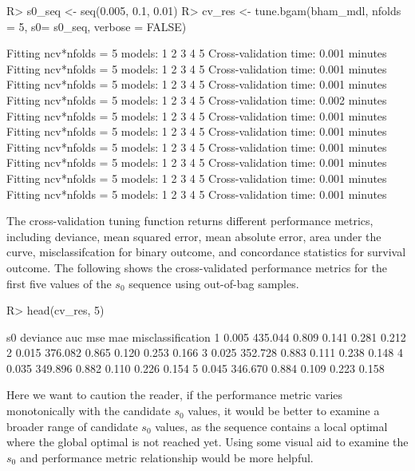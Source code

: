 \documentclass[
]{jss}
\begin{document}
\begin{CodeChunk}
\begin{CodeInput}
R> s0_seq <- seq(0.005, 0.1, 0.01)
R> cv_res <- tune.bgam(bham_mdl, nfolds = 5, s0= s0_seq, verbose = FALSE)
\end{CodeInput}
\begin{CodeOutput}
Fitting ncv*nfolds = 5 models: 
1 2 3 4 5 
 Cross-validation time: 0.001 minutes 
Fitting ncv*nfolds = 5 models: 
1 2 3 4 5 
 Cross-validation time: 0.001 minutes 
Fitting ncv*nfolds = 5 models: 
1 2 3 4 5 
 Cross-validation time: 0.001 minutes 
Fitting ncv*nfolds = 5 models: 
1 2 3 4 5 
 Cross-validation time: 0.002 minutes 
Fitting ncv*nfolds = 5 models: 
1 2 3 4 5 
 Cross-validation time: 0.001 minutes 
Fitting ncv*nfolds = 5 models: 
1 2 3 4 5 
 Cross-validation time: 0.001 minutes 
Fitting ncv*nfolds = 5 models: 
1 2 3 4 5 
 Cross-validation time: 0.001 minutes 
Fitting ncv*nfolds = 5 models: 
1 2 3 4 5 
 Cross-validation time: 0.001 minutes 
Fitting ncv*nfolds = 5 models: 
1 2 3 4 5 
 Cross-validation time: 0.001 minutes 
Fitting ncv*nfolds = 5 models: 
1 2 3 4 5 
 Cross-validation time: 0.001 minutes 
\end{CodeOutput}
\end{CodeChunk}

The cross-validation tuning function returns different performance
metrics, including deviance, mean squared error, mean absolute error,
area under the curve, misclassifcation for binary outcome, and
concordance statistics for survival outcome. The following shows the
cross-validated performance metrics for the first five values of the
\(s_0\) sequence using out-of-bag samples.

\begin{CodeChunk}
\begin{CodeInput}
R> head(cv_res, 5)
\end{CodeInput}
\begin{CodeOutput}
     s0 deviance   auc   mse   mae misclassification
1 0.005  435.044 0.809 0.141 0.281             0.212
2 0.015  376.082 0.865 0.120 0.253             0.166
3 0.025  352.728 0.883 0.111 0.238             0.148
4 0.035  349.896 0.882 0.110 0.226             0.154
5 0.045  346.670 0.884 0.109 0.223             0.158
\end{CodeOutput}
\end{CodeChunk}

Here we want to caution the reader, if the performance metric varies
monotonically with the candidate \(s_0\) values, it would be better to
examine a broader range of candidate \(s_0\) values, as the sequence
contains a local optimal where the global optimal is not reached yet.
Using some visual aid to examine the \(s_0\) and performance metric
relationship would be more helpful.
\end{document}
